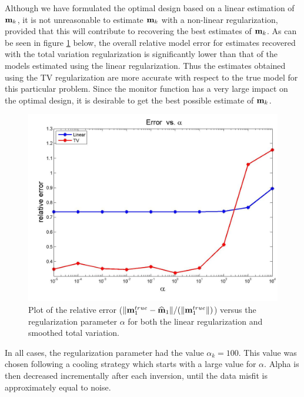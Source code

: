 \documentclass[leqno,onefignum,onetabnum]{siamltexmm}
\newcommand{\bfm}	{{\bf{m}}}
\newcommand{\bfmhat}    {{\widehat{\bfm}}}
\begin{document}
Although we have formulated the optimal design based on a linear estimation of $\bfm_k$, it is not unreasonable to estimate $\bfm_k$  with a non-linear regularization, provided that this will contribute to recovering the best estimates of $\bfm_k$. As can be seen in figure \ref{fig:erro1} below, the overall relative model error for estimates recovered with the total variation regularization is significantly lower than that of the models estimated using the linear regularization. Thus the estimates obtained using the TV regularization are more accurate with respect to the true model for this particular problem. 
Since the monitor function has a very large impact on the optimal design, it is desirable to get the best possible estimate of $\bfm_k$. 
%
\begin{figure}
\begin{center}
\iwidth=180mm
\includegraphics[width=.75\iwidth]{figures/newFigs/exp2-error1}
\end{center}
\caption{Plot of the relative error ($\|\bfm_1^{true}-\bfmhat_1\|/(    \|\bfm^{true}_1\|)$) versus the regularization parameter $\alpha$ for both the linear regularization and smoothed total variation. }
	\label{fig:erro1}
\end{figure} 

In all cases, the regularization parameter had the value $\alpha_k = 100$. This value was chosen following a cooling strategy which starts with a large value for $\alpha$. Alpha is then decreased incrementally after each inversion, until the data misfit is approximately equal to noise.
\end{document}
